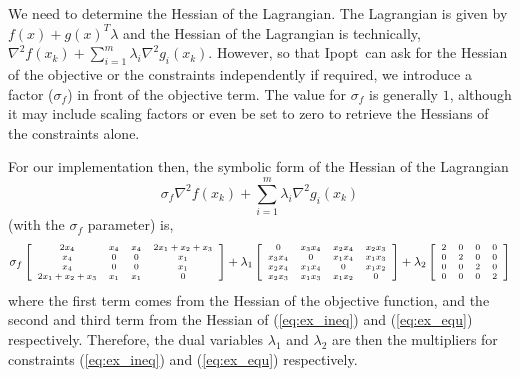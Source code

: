\documentclass[letter,10pt]{article}
\newcommand{\Ipopt}{{\sc Ipopt}}
\begin{document}
We need to determine the Hessian of the Lagrangian.  The Lagrangian is
given by $f(x) + g(x)^T \lambda$ and the Hessian of the Lagrangian is
technically, $ \nabla^2 f(x_k) + \sum_{i=1}^m\lambda_i\nabla^2 g_i(x_k)$.
However, so that \Ipopt\ can ask for the Hessian of the objective or the
constraints independently if required, we introduce a factor
($\sigma_f$) in front of the objective term. The value for $\sigma_f$
is generally $1$, although it may include scaling factors or even be
set to zero to retrieve the Hessians of the constraints alone.

For our implementation then, the symbolic form of the Hessian of the
Lagrangian
\[
\sigma_f \nabla^2 f(x_k) + \sum_{i=1}^m\lambda_i\nabla^2 g_i(x_k)
\]
(with the $\sigma_f$ parameter) is,
\begin{equation}
\scriptsize
\sigma_f \left[
\begin{array}{cccc}
2 x_4           & x_4           & x_4           & 2 x_1 + x_2 + x_3     \\
x_4             & 0             & 0             & x_1                   \\
x_4             & 0             & 0             & x_1                   \\
2 x_1+x_2+x_3   & x_1           & x_1           & 0
\end{array}
\right]
+
\lambda_1
\left[
\begin{array}{cccc}
0               & x_3 x_4       & x_2 x_4       & x_2 x_3       \\
x_3 x_4         & 0             & x_1 x_4       & x_1 x_3       \\
x_2 x_4         & x_1 x_4       & 0             & x_1 x_2       \\
x_2 x_3         & x_1 x_3       & x_1 x_2       & 0 
\end{array}
\right]
+
\lambda_2
\left[
\begin{array}{cccc}
2       & 0     & 0     & 0     \\
0       & 2     & 0     & 0     \\
0       & 0     & 2     & 0     \\
0       & 0     & 0     & 2
\end{array}
\right]
\end{equation}
where the first term comes from the Hessian of the objective function,
and the second and third term from the Hessian of (\ref{eq:ex_ineq})
and (\ref{eq:ex_equ}) respectively. Therefore, the dual variables
$\lambda_1$ and $\lambda_2$ are then the multipliers for constraints
(\ref{eq:ex_ineq}) and (\ref{eq:ex_equ}) respectively.
\end{document}
